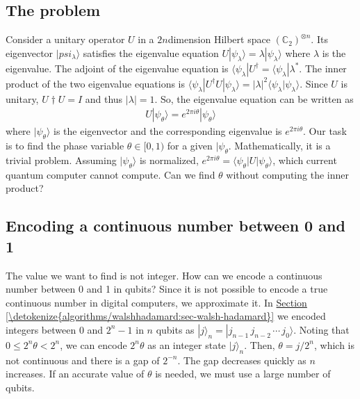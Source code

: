 \documentclass[letterpaper,10pt,english]{jupyterBook}
\begin{document}
\subsection{The problem}
\label{\detokenize{algorithms/qpe:the-problem}}
\sphinxAtStartPar
Consider a unitary operator \(U\) in a \(2n\)\sphinxhyphen{}dimension Hilbert space \((\mathbb{C}_2)^{\otimes n}\).  Its eigenvector \(|psi_\lambda\rangle\) satisfies the eigenvalue equation \(U |\psi_\lambda\rangle = \lambda |\psi_\lambda\rangle\) where \(\lambda\) is the eigenvalue. The adjoint of the eigenvalue equation is \(\langle \psi_\lambda| U^\dagger = \langle \psi_\lambda| \lambda^*\). The inner product of the two eigenvalue equations is \(\langle \psi_\lambda| U^\dagger U |\psi_\lambda\rangle = |\lambda|^2 \langle\psi_\lambda|\psi_\lambda\rangle\).  Since \(U\) is unitary, \(U\dagger U = I\) and thus \(|\lambda|=1\). So, the eigenvalue equation can be written as
\begin{equation*}
\begin{split}
U|\psi_\theta\rangle = e^{2 \pi i\theta} |\psi_\theta\rangle
\end{split}
\end{equation*}
\sphinxAtStartPar
where \(|\psi_\theta\rangle\) is the eigenvector and the corresponding eigenvalue is \(e^{2\pi i\theta}\). Our task is to find the phase variable  \(\theta \in [0,1)\) for a given \(|\psi_\theta\).  Mathematically, it is a trivial problem. Assuming \(|\psi_\theta\rangle\) is normalized, \(e^{2\pi i \theta} =  \langle \psi_\theta | U | \psi_\theta \rangle\), which current quantum computer cannot compute.  Can we find \(\theta\) without computing the inner product?


\subsection{Encoding a continuous number between 0 and 1}
\label{\detokenize{algorithms/qpe:encoding-a-continuous-number-between-0-and-1}}\label{\detokenize{algorithms/qpe:ssec-binary-fraction}}
\sphinxAtStartPar
The value we want to find is not integer.  How can we encode a continuous number between 0 and 1 in qubits? Since it is not possible to encode a true continuous number in digital computers, we approximate it.  In \hyperref[\detokenize{algorithms/walshhadamard:sec-walsh-hadamard}]{Section \ref{\detokenize{algorithms/walshhadamard:sec-walsh-hadamard}}} we encoded integers between \(0\) and \(2^n-1\) in \(n\) qubits as \(|j\rangle_n = |j_{n-1}\,j_{n-2}\,\cdots\,j_{0} \rangle\).  Noting that \( 0 \le 2^n \theta < 2^n\), we can encode \(2^n \theta\) as an integer state \(|j\rangle_n\).  Then, \(\theta = j/2^n\), which is not continuous and there is a gap of \(2^{-n}\).  The gap decreases quickly as \(n\) increases.  If an accurate value of \(\theta\) is needed, we must use a large number of qubits.
\end{document}
